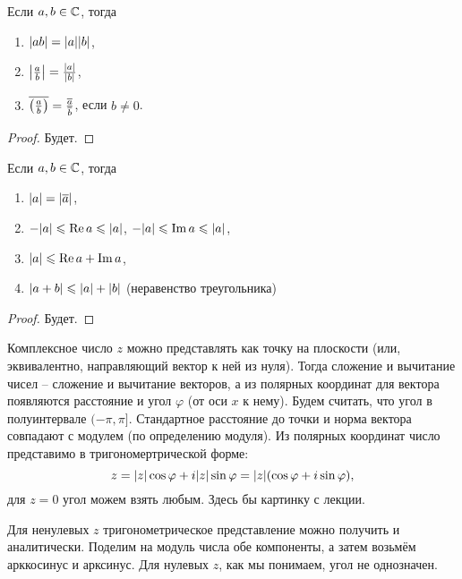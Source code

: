 \begin{proposition}
	Если $a, b \in \Cm$, тогда
	\begin{enumerate}
		\item $\mds{ab} = \mds a \mds b$,
		\item $\mds{\frac{a}{b}} = \frac{\mds a}{\mds b}$,
		\item $\ol{\jleft( \frac{a}{b} \jright)} = \frac{\ol a}{\ol b}$, если $b \neq 0$.
	\end{enumerate}
\end{proposition}
\begin{proof}
	Будет.
\end{proof}

\begin{proposition}
	Если $a, b \in \Cm$, тогда
	\begin{enumerate}
		\item $\mds a = \mds{\ol a}$,
		\item $- \mds a \le \re a \le \mds a$, $- \mds a \le \im a \le \mds a$,
		\item $\mds a \le \re a + \im a$,
		\item $\mds{a + b} \le \mds a + \mds b$ (неравенство треугольника)
	\end{enumerate}
\end{proposition}
\begin{proof}
	Будет.
\end{proof}

\begin{note}
	Комплексное число $z$ можно представлять как точку на плоскости (или, эквивалентно, направляющий вектор к ней из нуля). Тогда сложение и вычитание чисел -- сложение и вычитание векторов, а из полярных координат для вектора появляются расстояние и угол $\varphi$ (от оси $x$ к нему). Будем считать, что угол в полуинтервале $(-\pi, \pi]$. Стандартное расстояние до точки и норма вектора совпадают с модулем (по определению модуля). Из полярных координат число представимо в тригономертрической форме:
	\[
		z = \mds z \cos \phi + i \mds z \sin \phi = \mds z (\cos \phi + i \sin \phi),
	\]
	для $z = 0$ угол можем взять любым.
	{\color{red} Здесь бы картинку с лекции.}
\end{note}
\begin{anote}
	Для ненулевых $z$ тригонометрическое представление можно получить и аналитически. Поделим на модуль числа обе компоненты, а затем возьмём арккосинус и арксинус. Для нулевых $z$, как мы понимаем, угол не однозначен.
\end{anote}

